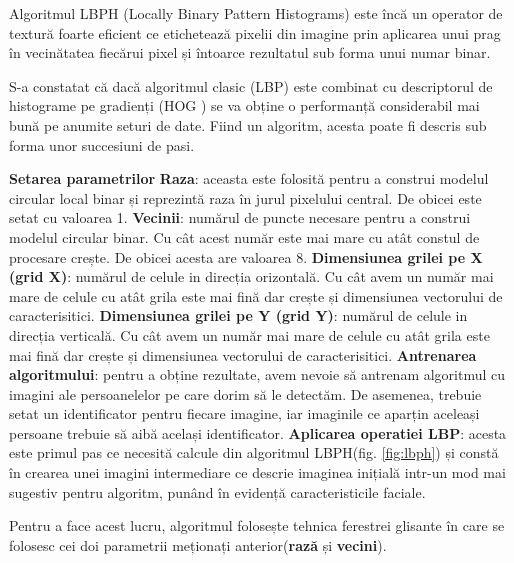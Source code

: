 \documentclass[a4paper, 12pt]{article}
\begin{document}
	Algoritmul LBPH \textbf{\cite{pietikinen}} (Locally Binary Pattern Histograms) este încă un operator de textură foarte eficient ce etichetează pixelii din imagine prin aplicarea unui prag în vecinătatea fiecărui pixel și întoarce rezultatul sub forma unui numar binar. \textbf{\cite{salton_prado_salton_prado_2017}}
	
	S-a constatat că dacă algoritmul clasic (LBP)  este combinat cu descriptorul de histograme pe gradienți (HOG \textbf{\cite{dalal2005histograms}}) se va obține o performanță considerabil mai bună pe anumite seturi de date. Fiind un algoritm, acesta poate fi descris sub forma unor succesiuni de pasi. \textbf{\cite{salton_prado_salton_prado_2017}}
	\begin{outline}[enumerate]
		\1 \textbf{Setarea parametrilor}
		\2 \textbf{Raza}: aceasta este folosită pentru a construi modelul circular local binar și reprezintă raza în jurul pixelului central. De obicei este setat cu valoarea 1. \textbf{\cite{salton_prado_salton_prado_2017}}
		\2 \textbf{Vecinii}: numărul de puncte necesare pentru a construi modelul circular binar. Cu cât acest număr este mai mare cu atât constul de procesare crește. De obicei acesta are valoarea 8. \textbf{\cite{salton_prado_salton_prado_2017}}
		\2 \textbf{Dimensiunea grilei pe X (grid X)}: numărul de celule in direcția orizontală. Cu cât avem un număr mai mare de celule cu atât grila este mai fină dar crește și dimensiunea vectorului de caracterisitici. \textbf{\cite{salton_prado_salton_prado_2017}}
		\2 \textbf{Dimensiunea grilei pe Y (grid Y)}: numărul de celule in direcția verticală. Cu cât avem un număr mai mare de celule cu atât grila este mai fină dar crește și dimensiunea vectorului de caracterisitici. \textbf{\cite{salton_prado_salton_prado_2017}}
		\1 \textbf{Antrenarea algoritmului}: pentru a obține rezultate, avem nevoie să antrenam algoritmul cu imagini ale persoanelelor pe care dorim să le detectăm. De asemenea, trebuie setat un identificator pentru fiecare imagine, iar imaginile ce aparțin aceleași persoane trebuie să aibă același identificator.
		\1 \textbf{Aplicarea operatiei LBP}: acesta este primul pas ce necesită calcule din algoritmul LBPH(fig. \ref{fig:lbph}) și constă în crearea unei imagini intermediare ce descrie imaginea inițială intr-un mod mai sugestiv pentru algoritm, punând în evidență caracteristicile faciale. 
		
		\quad Pentru a face acest lucru, algoritmul folosește tehnica ferestrei glisante în care se folosesc cei doi parametrii meționați anterior(\textbf{rază} și \textbf{vecini}). \textbf{\cite{salton_prado_salton_prado_2017}}
		

\end{outline}
\end{document}
